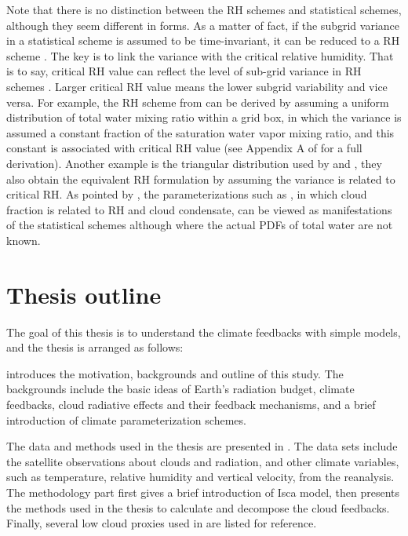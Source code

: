 Note that there is no distinction between the RH schemes and statistical schemes, although they seem different in forms. As a matter of fact, if the subgrid variance in a statistical scheme is assumed to be time-invariant, it can be reduced to a RH scheme \citep{Tompkins2002,Tompkins2005}. The key is to link the variance with the critical relative humidity. That is to say, critical RH value can reflect the level of sub-grid variance in RH schemes \citep{Quaas2012}. Larger critical RH value means the lower subgrid variability and vice versa. For example, the RH scheme from \cite{Sundqvist1978} can be derived by assuming a uniform distribution of total water mixing ratio within a grid box, in which the variance is assumed a constant fraction of the saturation water vapor mixing ratio, and this constant is associated with critical RH value (see Appendix A of \cite{Quaas2012} for a full derivation). Another example is the triangular distribution used by \cite{Smith1990} and \cite{Park2014}, they also obtain the equivalent RH formulation by assuming the variance is related to critical RH. As pointed by \cite{Tompkins2002}, the parameterizations such as \cite{Xu1996}, in which cloud fraction is related to RH and cloud condensate, can be viewed as manifestations of the statistical schemes although where the actual PDFs of total water are not known. %

\section{Thesis outline}
\label{sec:thesis_layout}

The goal of this thesis is to understand the climate feedbacks with simple models, and the thesis is arranged as follows:

 introduces the motivation, backgrounds and outline of this study. The backgrounds include the basic ideas of Earth's radiation budget, climate feedbacks, cloud radiative effects and their feedback mechanisms, and a brief introduction of climate parameterization schemes.

 The data and methods used in the thesis are presented in . The data sets include the satellite observations about clouds and radiation, and other climate variables, such as temperature, relative humidity and vertical velocity, from the reanalysis. The methodology part first gives a brief introduction of Isca model, then presents the methods used in the thesis to calculate and decompose the cloud feedbacks. Finally, several low cloud proxies used in  are listed for reference.

